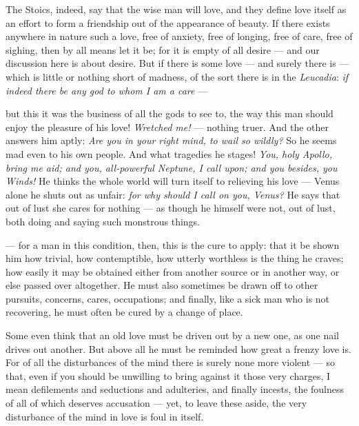  The Stoics, indeed, say that the wise man will love, and they define love itself as an effort to form a friendship out of the appearance of beauty. If there exists anywhere in nature such a love, free of anxiety, free of longing, free of care, free of sighing, then by all means let it be; for it is empty of all desire — and our discussion here is about desire. But if there is some love — and surely there is — which is little or nothing short of madness, of the sort there is in the \textit{Leucadia}: \textit{if indeed there be any god to whom I am a care} —

 but this it was the business of all the gods to see to, the way this man should enjoy the pleasure of his love! \textit{Wretched me!} — nothing truer. And the other answers him aptly: \textit{Are you in your right mind, to wail so wildly?} So he seems mad even to his own people. And what tragedies he stages! \textit{You, holy Apollo, bring me aid; and you, all-powerful Neptune, I call upon; and you besides, you Winds!} He thinks the whole world will turn itself to relieving his love — Venus alone he shuts out as unfair: \textit{for why should I call on you, Venus?} He says that out of lust she cares for nothing — as though he himself were not, out of lust, both doing and saying such monstrous things.

 — for a man in this condition, then, this is the cure to apply: that it be shown him how trivial, how contemptible, how utterly worthless is the thing he craves; how easily it may be obtained either from another source or in another way, or else passed over altogether. He must also sometimes be drawn off to other pursuits, concerns, cares, occupations; and finally, like a sick man who is not recovering, he must often be cured by a change of place.

 Some even think that an old love must be driven out by a new one, as one nail drives out another. But above all he must be reminded how great a frenzy love is. For of all the disturbances of the mind there is surely none more violent — so that, even if you should be unwilling to bring against it those very charges, I mean defilements and seductions and adulteries, and finally incests, the foulness of all of which deserves accusation — yet, to leave these aside, the very disturbance of the mind in love is foul in itself.

